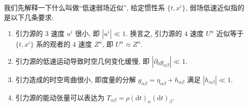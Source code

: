 我们先解释一下什么叫做``低速弱场近似'', 给定惯性系 $\{t,x^i\}$, 弱场低速近似指的是以下几条要求:
\begin{enumerate}
	\item 引力源的 $3$ 速度 $u^i$ 很小, 即 $|u^i|\ll 1$. 换言之, 引力源的 $4$ 速度 $U^\alpha$ 近似等于 $\{t,x^i\}$ 系的观者的 $4$ 速度 $Z^{\alpha}$, 即 $U^{\alpha}\approx Z^{\alpha}$.
	\item 引力源的低速运动导致时空几何变化缓慢, 即 $|\partial_0g_{\alpha\beta}|\ll 1$.
	\item 引力造成的时空弯曲很小, 即度量的分解 $g_{\alpha\beta}=\eta_{\alpha\beta}+h_{\alpha\beta}$ 满足 $ |h_{\alpha\beta}|\ll 1$.
	\item 引力源的能动张量可以表达为 $ T_{\alpha\beta}=\rho(\mathrm{d}t)_{\alpha}(\mathrm{d}t)_{\beta} $.  
\end{enumerate}

